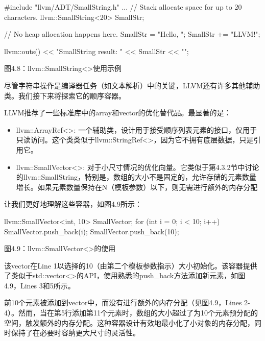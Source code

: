 \begin{cpp}
#include "llvm/ADT/SmallString.h"
...
// Stack allocate space for up to 20 characters.
llvm::SmallString<20> SmallStr;

// No heap allocation happens here.
SmallStr = "Hello, ";
SmallStr += "LLVM!";

llvm::outs() << "SmallString result: " << SmallStr << "\n";
\end{cpp}

\begin{center}
图4.8：llvm::SmallString<>使用示例
\end{center}

尽管字符串操作是编译器任务（如文本解析）中的关键，LLVM还有许多其他辅助类。我们接下来将探索它的顺序容器。


LLVM推荐了一些标准库中的array和vector的优化替代品。最显著的是：

\begin{itemize}
\item
llvm::ArrayRef<>: 一个辅助类，设计用于接受顺序列表元素的接口，仅用于只读访问。这个类类似于llvm::StringRef<>，因为它不拥有底层数据，只是引用它。
\item
llvm::SmallVector<>: 对于小尺寸情况的优化向量。它类似于第4.3.2节中讨论的llvm::SmallString，特别是，数组的大小不是固定的，允许存储的元素数量增长。如果元素数量保持在N（模板参数）以下，则无需进行额外的内存分配
\end{itemize}

让我们更好地理解这些容器，如图4.9所示：

\begin{cpp}
llvm::SmallVector<int, 10> SmallVector;
for (int i = 0; i < 10; i++) {
  SmallVector.push_back(i);
}
SmallVector.push_back(10);
\end{cpp}

\begin{center}
图4.9：llvm::SmallVector<>的使用
\end{center}

该vector在Line 1以选择的10（由第二个模板参数指示）大小初始化。该容器提供了类似于std::vector<>的API，使用熟悉的push\_back方法添加新元素，如图4.9，Lines 3和5所示。

前10个元素被添加到vector中，而没有进行额外的内存分配（见图4.9，Lines 2-4）。然而，当在第5行添加第11个元素时，数组的大小超过了为10个元素预分配的空间，触发额外的内存分配。这种容器设计有效地最小化了小对象的内存分配，同时保持了在必要时容纳更大尺寸的灵活性。

